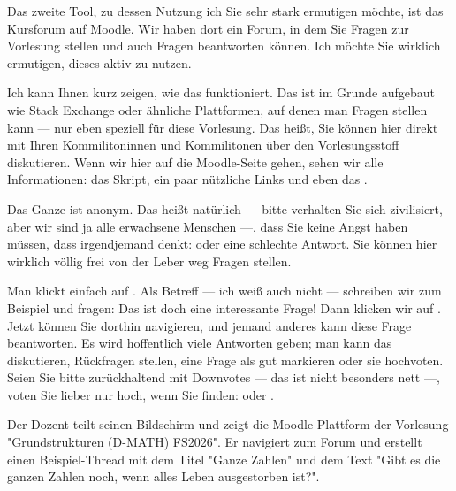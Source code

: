 \begin{spoken-clean}[00:09:43 - 00:12:15]
Das zweite Tool, zu dessen Nutzung ich Sie sehr stark ermutigen möchte, ist das Kursforum auf Moodle. Wir haben dort ein Forum, in dem Sie Fragen zur Vorlesung stellen und auch Fragen beantworten können. Ich möchte Sie wirklich ermutigen, dieses aktiv zu nutzen.

Ich kann Ihnen kurz zeigen, wie das funktioniert. Das ist im Grunde aufgebaut wie Stack Exchange oder ähnliche Plattformen, auf denen man Fragen stellen kann --- nur eben speziell für diese Vorlesung. Das heißt, Sie können hier direkt mit Ihren Kommilitoninnen und Kommilitonen über den Vorlesungsstoff diskutieren. Wenn wir hier auf die Moodle-Seite gehen, sehen wir alle Informationen: das Skript, ein paar nützliche Links und eben das .

Das Ganze ist anonym. Das heißt natürlich --- bitte verhalten Sie sich zivilisiert, aber wir sind ja alle erwachsene Menschen ---, dass Sie keine Angst haben müssen, dass irgendjemand denkt:  oder eine schlechte Antwort. Sie können hier wirklich völlig frei von der Leber weg Fragen stellen.

Man klickt einfach auf . Als Betreff --- ich weiß auch nicht --- schreiben wir zum Beispiel  und fragen:  Das ist doch eine interessante Frage! Dann klicken wir auf . Jetzt können Sie dorthin navigieren, und jemand anderes kann diese Frage beantworten. Es wird hoffentlich viele Antworten geben; man kann das diskutieren, Rückfragen stellen, eine Frage als gut markieren oder sie hochvoten. Seien Sie bitte zurückhaltend mit Downvotes --- das ist nicht besonders nett ---, voten Sie lieber nur hoch, wenn Sie finden:  oder .
\end{spoken-clean}

\begin{ai-global-state-checkpoint-invisible-content}
\end{ai-global-state-checkpoint-invisible-content}

\begin{meta-note}
Der Dozent teilt seinen Bildschirm und zeigt die Moodle-Plattform der Vorlesung "Grundstrukturen (D-MATH) FS2026". Er navigiert zum Forum und erstellt einen Beispiel-Thread mit dem Titel "Ganze Zahlen" und dem Text "Gibt es die ganzen Zahlen noch, wenn alles Leben ausgestorben ist?".
\end{meta-note}

